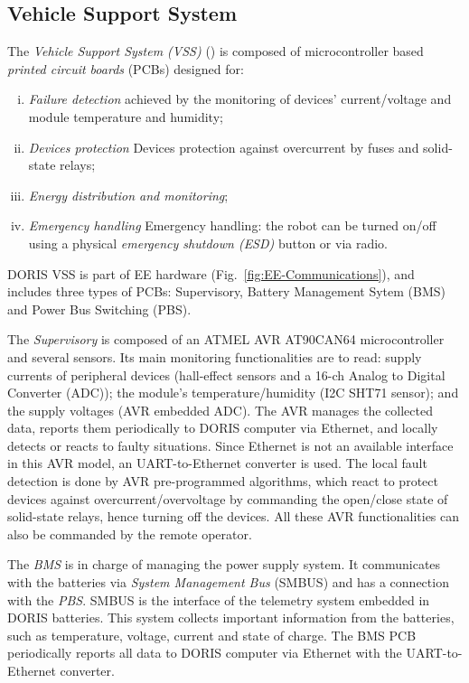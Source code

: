 \documentclass{ifacconf}
\begin{document}
\subsection{Vehicle Support System}\label{sec:VSS} 
The \emph{Vehicle Support System (VSS)} (\cite{MARIUS}) is composed of
microcontroller based \emph{printed circuit boards} (PCBs) designed for:

\begin{enumerate}[i)]
\item \emph{Failure detection} achieved by the monitoring of devices'
current/voltage and module temperature and humidity;
\item \emph{Devices protection} Devices protection against overcurrent by fuses and
solid-state relays;
\item \emph{Energy distribution and monitoring};
\item \emph{Emergency handling} Emergency handling: the robot can be turned on/off
using a physical \emph{emergency shutdown (ESD)} button
or via radio.
\end{enumerate}

DORIS VSS is part of EE hardware (Fig.~\ref{fig:EE-Communications}), and
includes three types of PCBs: Supervisory, Battery Management Sytem (BMS) and
Power Bus Switching (PBS).

The \emph{Supervisory} is composed of an ATMEL AVR AT90CAN64 microcontroller
and several sensors. Its main monitoring functionalities are to read: supply
currents of peripheral devices (hall-effect sensors and a 16-ch Analog to
Digital Converter (ADC)); the module's temperature/humidity (I2C SHT71 sensor);
and the supply voltages (AVR embedded ADC). The AVR manages the collected data,
reports them periodically to DORIS computer via Ethernet, and locally detects or
reacts to faulty situations. Since Ethernet is not an available interface in
this AVR model, an UART-to-Ethernet converter is used. The local fault
detection is done by AVR pre-programmed algorithms, which react to protect
devices against overcurrent/overvoltage by commanding the open/close state of
solid-state relays, hence turning off the devices. All these AVR
functionalities can also be commanded by the remote operator.

The \emph{BMS} is in charge of managing the power supply system. It
communicates with the batteries via \emph{System Management Bus} (SMBUS) and has
a connection with the \emph{PBS}. SMBUS is the interface of the telemetry
system embedded in DORIS batteries. This system collects important information
from the batteries, such as temperature, voltage, current and state of charge.
The BMS PCB periodically reports all data to DORIS computer via Ethernet with
the UART-to-Ethernet converter.
\end{document}

